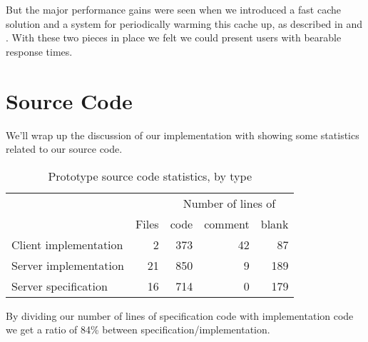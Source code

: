 But the major performance gains were seen when we introduced a fast cache
solution and a system for periodically warming this cache up,
as described in
 and
.
With these two pieces in place we felt we could present users with bearable
response times.

\section{Source Code}
\label{section:implementation.source.code}

We'll wrap up the discussion of our implementation with showing some
statistics related to our source code.

\begin{table}
  \begin{tabular}{lrrrr}

    &
    &
    \multicolumn{3}{c}{Number of lines of} \\

    &
    \multicolumn{1}{c}{Files} &
    \multicolumn{1}{c}{code} &
    \multicolumn{1}{c}{comment} &
    \multicolumn{1}{c}{blank} \\

    \cmidrule(lr){2-2}
    \cmidrule(lr){3-5}

    Client implementation &
    2 &
    373 &
    42 &
    87 \\

    Server implementation &
    21 &
    850 &
    9 &
    189 \\

    Server specification &
    16 &
    714 &
    0 &
    179 \\

  \end{tabular}
  \caption[Prototype Source Code Statistics]{%
    Prototype source code statistics, by type}
  \label{table:prototype.source.code.stats}
\end{table}

By dividing our number of lines of specification code with implementation code
we get a ratio of 84\% between specification/implementation.
